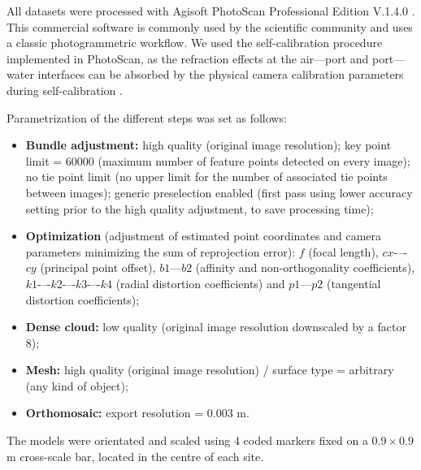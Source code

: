 All datasets were processed with Agisoft PhotoScan Professional Edition V.1.4.0 \citep{agisoft_agisoft_2018-1}. This commercial software is commonly used by the scientific community \citep{figueira_accuracy_2015, burns_assessing_2016, guo_accuracy_2016, casella_mapping_2017, mizuno_simple_2017} and uses a classic photogrammetric workflow. We used the self-calibration procedure implemented in PhotoScan, as the refraction effects at the air---port and port---water interfaces can be absorbed by the physical camera calibration parameters during self-calibration \citep{shortis_calibration_2015}.

Parametrization of the different steps was set as follows: 
\begin{itemize}
    \item \textbf{Bundle adjustment:} high quality (original image resolution); key point limit = 60000 (maximum number of feature points detected on every image); no tie point limit (no upper limit for the number of associated tie points between images); generic preselection enabled (first pass using lower accuracy setting prior to the high quality adjustment, to save processing time);
    \item \textbf{Optimization} (adjustment of estimated point coordinates and camera parameters minimizing the sum of reprojection error): $f$ (focal length), $cx$-–-$cy$ (principal point offset), $b1$---$b2$ (affinity and non-orthogonality coefficients), $k1$-–-$k2$-–-$k3$-–-$k4$ (radial distortion coefficients) and $p1$---$p2$ (tangential distortion coefficients);
    \item \textbf{Dense cloud:} low quality (original image resolution downscaled by a factor 8);
    \item \textbf{Mesh:} high quality (original image resolution) / surface type = arbitrary (any kind of object);
    \item \textbf{Orthomosaic:} export resolution = 0.003 m. 
    
\end{itemize}

The models were orientated and scaled using 4 coded markers fixed on a \(0.9\times0.9\) m cross-scale bar, located in the centre of each site.

